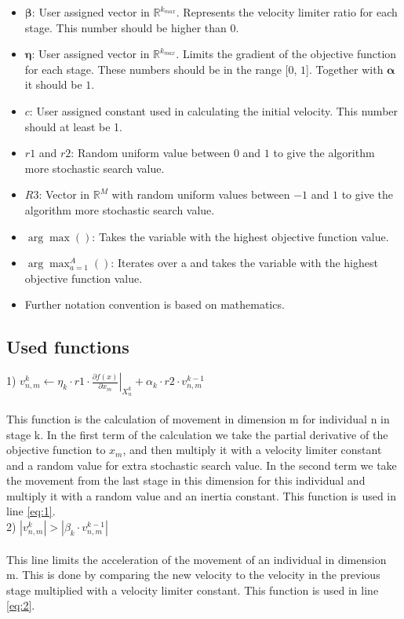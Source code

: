 \documentclass[runningheads]{llncs}
\begin{document}
\begin{itemize}
    \item $\boldsymbol{\beta}$: User assigned vector in $\mathds{R}^{k_{max}}$. Represents the velocity limiter ratio for each stage. This number should be higher than $0$.
    \item $\boldsymbol{\eta}$: User assigned vector in $\mathds{R}^{k_{max}}$. Limits the gradient of the objective function for each stage. These numbers should be in the range [$0$, $1$]. Together with $\boldsymbol{\alpha}$ it should be $1$.
    \item $c$: User assigned constant used in calculating the initial velocity. This number should at least be 1.
    \item $ r1 $ and $r2 $: Random uniform value between $ 0 $ and $ 1$ to give the algorithm more stochastic search value.
    \item $ R3 $: Vector in $\mathds{R}^M$ with random uniform values between $ -1 $ and $ 1$ to give the algorithm more stochastic search value.
    \item $\arg \max() $: Takes the variable with the highest objective function value.
    \item $\arg \max_{a=1}^A()$: Iterates over a and takes the variable with the highest objective function value.
    \item Further notation convention is based on mathematics.
\end{itemize}

\subsection{Used functions}

1) $
v_{n,m}^k \leftarrow \eta _k \cdot r1 \cdot  \left. \frac{\partial f(x)}{\partial x_m} \right \rvert_{X_{n}^k} + \alpha_k \cdot r2 \cdot v_{n,m}^{k-1}
$ \\ \\
This function is the calculation of movement in dimension m for individual n in stage k. In the first term of the calculation we take the partial derivative of the objective function to $x_m$, and then multiply it with a velocity limiter constant and a random value for extra stochastic search value. In the second term we take the movement from the last stage in this dimension for this individual and multiply it with a random value and an inertia constant. This function is used in line \ref{eq:1}. \\ 

2) $
\left \lvert v_{n,m}^k \right \rvert  > \left \lvert \beta_k \cdot v_{n,m}^{k-1} \right \rvert
$ \\ \\
This line limits the acceleration of the movement of an individual in dimension m. This is done by comparing the new velocity to the velocity in the previous stage multiplied with a velocity limiter constant. This function is used in line \ref{eq:2}. \\ 
\end{document}
